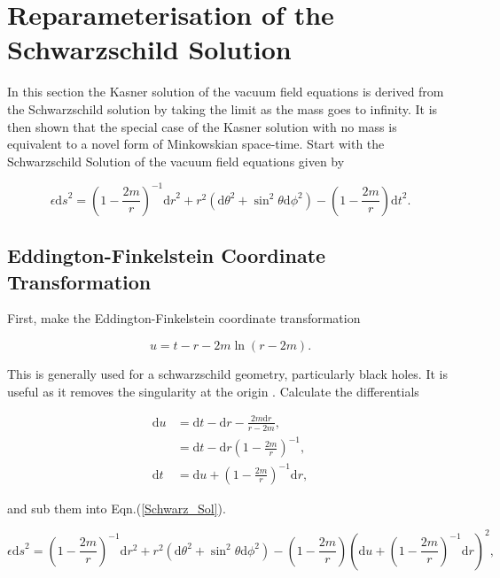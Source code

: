 \section{Reparameterisation of the Schwarzschild Solution}

In this section the Kasner solution of the vacuum field equations is derived from the Schwarzschild solution by taking the limit as the mass goes to infinity. It is then shown that the special case of the Kasner solution with no mass is equivalent to a novel form of Minkowskian space-time. Start with the Schwarzschild Solution of the vacuum field equations given by

\begin{equation}\label{Schwarz_Sol} 
\epsilon {\mathrm{d}s}^2 = {\left(1 - \frac{2m}{r}\right)}^{-1} {\mathrm{d}r}^{2} + r^2 ({\mathrm{d}\theta}^2 + {{\sin}^2 \theta}{\mathrm{d} \phi}^2) - \left(1 - \frac{2m}{r}\right) {\mathrm{d}t}^2.
\end{equation}

\subsection{Eddington-Finkelstein Coordinate Transformation}\label{Ed_Finkel_section}

\noindent First, make the Eddington-Finkelstein coordinate transformation

\begin{equation}\label{Ed-Fin_trans}
u = t - r - 2m \ln(r - 2m).
\end{equation}

\noindent This is generally used for a schwarzschild geometry, particularly black holes. It is useful as it removes the singularity at the origin \cite[]{}. Calculate the differentials

\begin{align*}
\mathrm{d}u & = \mathrm{d}t - \mathrm{d}r - \frac{2m \mathrm{d}r}{r - 2m},\\
            & = \mathrm{d}t - \mathrm{d}r{\left( 1-\frac{2m}{r}  \right)}^{-1},\\
\mathrm{d}t & = \mathrm{d}u + {\left( 1-\frac{2m}{r}  \right)}^{-1} \mathrm{d}r, 
\end{align*}

\noindent and sub them into Eqn.(\ref{Schwarz_Sol}).

\begin{equation*}
\epsilon {\mathrm{d}s}^{2} = {\left( 1-\frac{2m}{r}  \right)}^{-1} \mathrm{d}r^2 + r^2 ({\mathrm{d}\theta}^2 + {{\sin}^2 \theta}{\mathrm{d} \phi}^2) - {\left( 1-\frac{2m}{r}  \right)} {\left( \mathrm{d}u + {\left( 1-\frac{2m}{r}  \right)}^{-1} \mathrm{d}r \right)}^{2},
\end{equation*}

